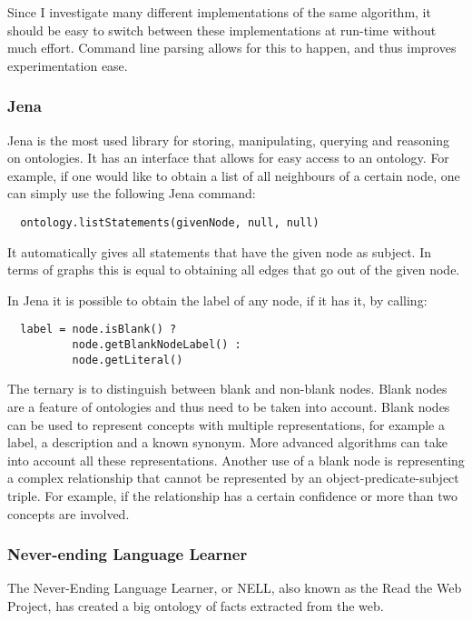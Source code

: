 \documentclass{article}
\begin{document}
 Since I investigate many different implementations of the same algorithm, it should be easy to switch between these implementations at run-time without much effort. Command line parsing allows for this to happen, and thus improves experimentation ease.
 
 \subsubsection{Jena}
 Jena is the most used library for storing, manipulating, querying and reasoning on ontologies. It has an interface that allows for easy access to an ontology. For example, if one would like to obtain a list of all neighbours of a certain node, one can simply use the following Jena command:
 \lstset{language=Java}
 \begin{lstlisting}
  ontology.listStatements(givenNode, null, null)
 \end{lstlisting}
 
 It automatically gives all statements that have the given node as subject. In terms of graphs this is equal to obtaining all edges that go out of the given node.
 
 In Jena it is possible to obtain the label of any node, if it has it, by calling:
 
 \lstset{language=Java}
 \begin{lstlisting}
  label = node.isBlank() ? 
  		  node.getBlankNodeLabel() : 
  		  node.getLiteral()
 \end{lstlisting}
 
 The ternary is to distinguish between blank and non-blank nodes. Blank nodes are a feature of ontologies and thus need to be taken into account. Blank nodes can be used to represent concepts with multiple representations, for example a label, a description and a known synonym. More advanced algorithms can take into account all these representations. Another use of a blank node is representing a complex relationship that cannot be represented by an object-predicate-subject triple. For example, if the relationship has a certain confidence or more than two concepts are involved.
 
 \subsubsection{Never-ending Language Learner}
 The Never-Ending Language Learner, or NELL, also known as the Read the Web Project, has created a big ontology of facts extracted from the web. 
 
\end{document}
